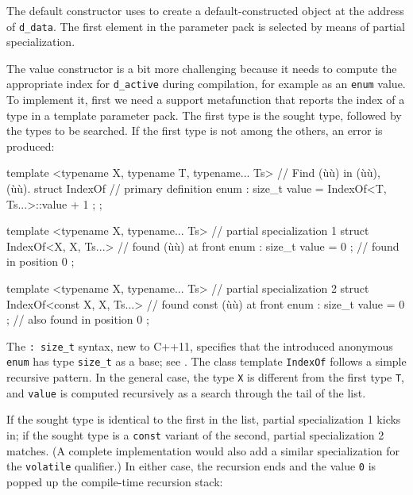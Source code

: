 \noindent The default constructor uses  to create a
default-constructed object at the address of \lstinline!d_data!. The first
element in the parameter pack is selected by means of partial
specialization.

The value constructor is a bit more challenging because it needs to
compute the appropriate index for \lstinline!d_active! during compilation,
for example as an \lstinline!enum! value. To implement it, first we need a
support metafunction that reports the index of a type in a template
parameter pack. The first type is the sought type, followed by the types
to be searched. If the first type is not among the others, an error is
produced:

\begin{emcppslisting}
template <typename X, typename T, typename... Ts>  // Find (ù{}ù) in (ù{}ù), (ù{}ù).
struct IndexOf                                     // primary definition
{
    enum : size_t { value = IndexOf<T, Ts...>::value + 1 };
};

template <typename X, typename... Ts>              // partial specialization 1
struct IndexOf<X, X, Ts...>                        // found (ù{}ù) at front
{
    enum : size_t { value = 0 };                   // found in position 0
};

template <typename X, typename... Ts>              // partial specialization 2
struct IndexOf<const X, X, Ts...>                  // found const (ù{}ù) at front
{
    enum : size_t { value = 0 };                   // also found in position 0
};
\end{emcppslisting}
    

\noindent The \lstinline!:!~\lstinline!size_t! syntax, new to C++11, specifies that the
introduced anonymous \lstinline!enum! has type \lstinline!size_t! as a base;
see . The class
template \lstinline!IndexOf! follows a simple recursive pattern. In the
general case, the type \lstinline!X! is different from the first type
\lstinline!T!, and \lstinline!value! is computed recursively as a search
through the tail of the list.

If the sought type is identical to the first in the list, partial
specialization 1 kicks in; if the sought type is a \lstinline!const!
variant of the second, partial specialization 2 matches. (A complete
implementation would also add a similar specialization for the
\lstinline!volatile! qualifier.) In either case, the recursion ends and the
value \lstinline!0! is popped up the compile-time recursion stack:


